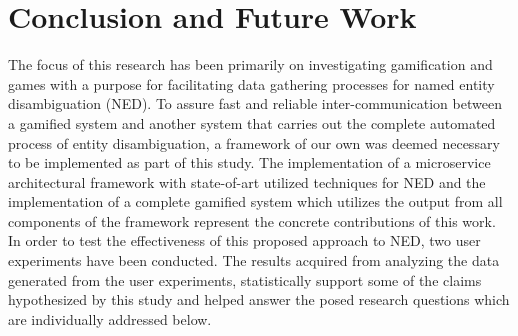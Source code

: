 \chapter{Conclusion and Future Work}
\label{chap:conclusion}







The focus of this research has been primarily on investigating gamification and games with a purpose for facilitating data gathering processes for named entity disambiguation (NED). To assure fast and reliable inter-communication between a gamified system and another system that carries out the complete automated process of entity disambiguation, a framework of our own was deemed necessary to be implemented as part of this study. The implementation of a microservice architectural framework with state-of-art utilized techniques for NED and the implementation of a complete gamified system which utilizes the output from all components of the framework represent the concrete contributions of this work. In order to test the effectiveness of this proposed approach to NED, two user experiments have been conducted. The results acquired from analyzing the data generated from the user experiments, statistically support some of the claims hypothesized by this study and helped answer the posed research questions which are individually addressed below.  \hfill \break

